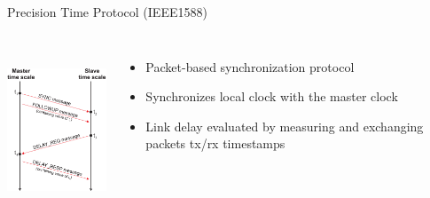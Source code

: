 \documentclass[compress,red]{beamer}
\begin{document}
\begin{frame}{Precision Time Protocol (IEEE1588)}

\begin{columns}[c]
  \column{1.5in}
      \begin{center}
	\includegraphics[height=5cm]{protocol/ptp_exchange.pdf}
      \end{center}
  \column{2.5in}
      \begin{itemize}
	  \item Packet-based synchronization protocol
	  \item Synchronizes local clock with the master clock
	  \item Link delay evaluated by measuring and exchanging packets tx/rx timestamps
      \end{itemize}
  \end{columns}
\end{frame}
\end{document}
